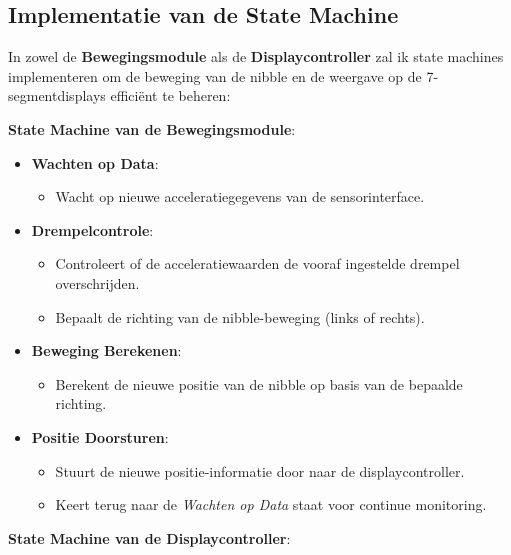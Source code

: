 \documentclass{article}
\begin{document}
\subsection*{Implementatie van de State Machine}

In zowel de \textbf{Bewegingsmodule} als de \textbf{Displaycontroller} zal ik state machines implementeren om de beweging van de nibble en de weergave op de 7-segmentdisplays efficiënt te beheren:

\textbf{State Machine van de Bewegingsmodule}:

\begin{itemize}
    \item \textbf{Wachten op Data}:
    \begin{itemize}
        \item Wacht op nieuwe acceleratiegegevens van de sensorinterface.
    \end{itemize}
    \item \textbf{Drempelcontrole}:
    \begin{itemize}
        \item Controleert of de acceleratiewaarden de vooraf ingestelde drempel overschrijden.
        \item Bepaalt de richting van de nibble-beweging (links of rechts).
    \end{itemize}
    \item \textbf{Beweging Berekenen}:
    \begin{itemize}
        \item Berekent de nieuwe positie van de nibble op basis van de bepaalde richting.
    \end{itemize}
    \item \textbf{Positie Doorsturen}:
    \begin{itemize}
        \item Stuurt de nieuwe positie-informatie door naar de displaycontroller.
        \item Keert terug naar de \textit{Wachten op Data} staat voor continue monitoring.
    \end{itemize}
\end{itemize}

\textbf{State Machine van de Displaycontroller}:
\end{document}
